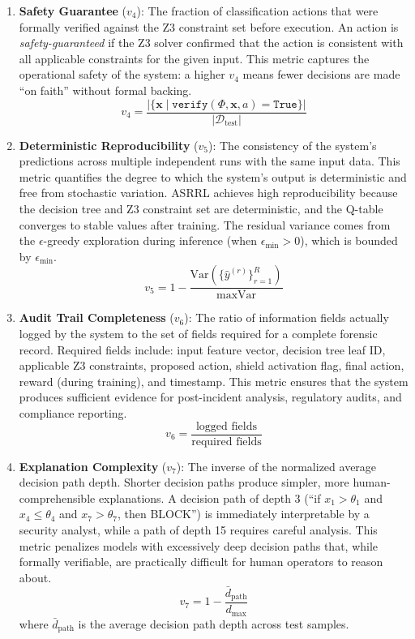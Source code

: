 \documentclass[12pt, letterpaper, oneside]{report}
\newcommand{\ASRRL}{\textsc{ASRRL}}
\newcommand{\bx}{\mathbf{x}}
\begin{document}
\begin{enumerate}
    \item \textbf{Safety Guarantee} ($v_4$): The fraction of classification actions that were formally verified against the Z3 constraint set before execution. An action is \emph{safety-guaranteed} if the Z3 solver confirmed that the action is consistent with all applicable constraints for the given input. This metric captures the operational safety of the system: a higher $v_4$ means fewer decisions are made ``on faith'' without formal backing.
    \begin{equation}
    v_4 = \frac{|\{\bx \mid \texttt{verify}(\Phi, \bx, a) = \texttt{True}\}|}{|\mathcal{D}_{\text{test}}|}
    \end{equation}

    \item \textbf{Deterministic Reproducibility} ($v_5$): The consistency of the system's predictions across multiple independent runs with the same input data. This metric quantifies the degree to which the system's output is deterministic and free from stochastic variation. \ASRRL{} achieves high reproducibility because the decision tree and Z3 constraint set are deterministic, and the Q-table converges to stable values after training. The residual variance comes from the $\epsilon$-greedy exploration during inference (when $\epsilon_{\min} > 0$), which is bounded by $\epsilon_{\min}$.
    \begin{equation}
    v_5 = 1 - \frac{\text{Var}(\{\hat{y}^{(r)}\}_{r=1}^{R})}{\max \text{Var}}
    \end{equation}

    \item \textbf{Audit Trail Completeness} ($v_6$): The ratio of information fields actually logged by the system to the set of fields required for a complete forensic record. Required fields include: input feature vector, decision tree leaf ID, applicable Z3 constraints, proposed action, shield activation flag, final action, reward (during training), and timestamp. This metric ensures that the system produces sufficient evidence for post-incident analysis, regulatory audits, and compliance reporting.
    \begin{equation}
    v_6 = \frac{\text{logged fields}}{\text{required fields}}
    \end{equation}

    \item \textbf{Explanation Complexity} ($v_7$): The inverse of the normalized average decision path depth. Shorter decision paths produce simpler, more human-comprehensible explanations. A decision path of depth 3 (``if $x_1 > \theta_1$ and $x_4 \leq \theta_4$ and $x_7 > \theta_7$, then BLOCK'') is immediately interpretable by a security analyst, while a path of depth 15 requires careful analysis. This metric penalizes models with excessively deep decision paths that, while formally verifiable, are practically difficult for human operators to reason about.
    \begin{equation}
    v_7 = 1 - \frac{\bar{d}_{\text{path}}}{d_{\max}}
    \end{equation}
    where $\bar{d}_{\text{path}}$ is the average decision path depth across test samples.
\end{enumerate}
\end{document}
